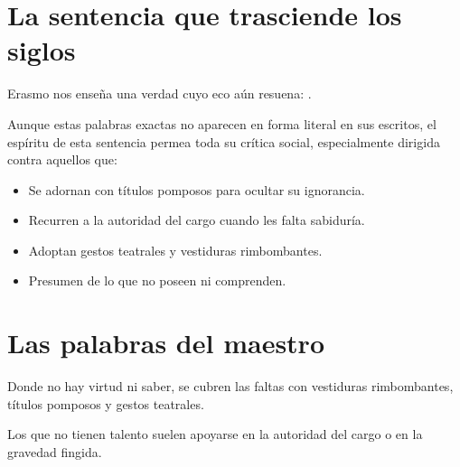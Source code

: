 \documentclass{claudeeditorial}
\begin{document}
\BodyCopy
\ClaudeCover


\begin{claudehero}
\end{claudehero}

\section{La sentencia que trasciende los siglos}

Erasmo nos enseña una verdad cuyo eco aún resuena: .

Aunque estas palabras exactas no aparecen en forma literal en sus escritos, el espíritu de esta sentencia permea toda su crítica social, especialmente dirigida contra aquellos que:

\begin{itemize}
\item Se adornan con títulos pomposos para ocultar su ignorancia.
\item Recurren a la autoridad del cargo cuando les falta sabiduría.
\item Adoptan gestos teatrales y vestiduras rimbombantes.
\item Presumen de lo que no poseen ni comprenden.
\end{itemize}

\section{Las palabras del maestro}

\begin{claudequote}
Donde no hay virtud ni saber, se cubren las faltas con vestiduras rimbombantes, títulos pomposos y gestos teatrales.
\end{claudequote}

\begin{claudequote}
Los que no tienen talento suelen apoyarse en la autoridad del cargo o en la gravedad fingida.
\end{claudequote}
\end{document}
